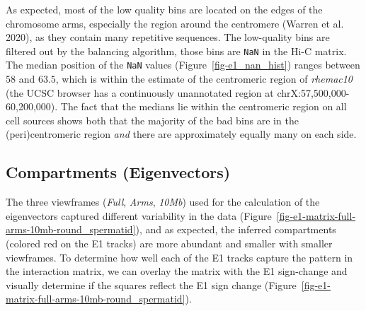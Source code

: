 \documentclass[
  11pt,
  a4paper,
]{scrbook}
\let\origfigure\figure
\let\endorigfigure\endfigure
\renewenvironment{figure}[1][2] {
    \expandafter\origfigure\expandafter[htbp]
} {
    \endorigfigure
}
\begin{document}
As expected, most of the low quality bins are located on the edges of
the chromosome arms, especially the region around the centromere (Warren
et al. 2020), as they contain many repetitive sequences. The low-quality
bins are filtered out by the balancing algorithm, those bins are
\texttt{NaN} in the Hi-C matrix. The median position of the \texttt{NaN}
values (Figure~\ref{fig-e1_nan_hist}) ranges between \(58\) and
\(63.5\), which is within the estimate of the centromeric region of
\emph{rhemac10} (the UCSC browser has a continuously unannotated region
at chrX:57,500,000-60,200,000). The fact that the medians lie within the
centromeric region on all cell sources shows both that the majority of
the bad bins are in the (peri)centromeric region \emph{and} there are
approximately equally many on each side.

\begin{figure}[H]


\caption{\label{fig-e1_nan_hist}Histogram of NaN values in the E1
eigenvector for each cell type. Median position is marked with a red
dashed line.}

\end{figure}%

\subsection{Compartments (Eigenvectors)}\label{sec-results-eigenvectors}

The three viewframes (\emph{Full}, \emph{Arms}, \emph{10Mb}) used for
the calculation of the eigenvectors captured different variability in
the data (Figure~\ref{fig-e1-matrix-full-arms-10mb-round_spermatid}),
and as expected, the inferred compartments (colored red on the E1
tracks) are more abundant and smaller with smaller viewframes. To
determine how well each of the E1 tracks capture the pattern in the
interaction matrix, we can overlay the matrix with the E1 sign-change
and visually determine if the squares reflect the E1 sign change
(Figure~\ref{fig-e1-matrix-full-arms-10mb-round_spermatid}).
\end{document}
